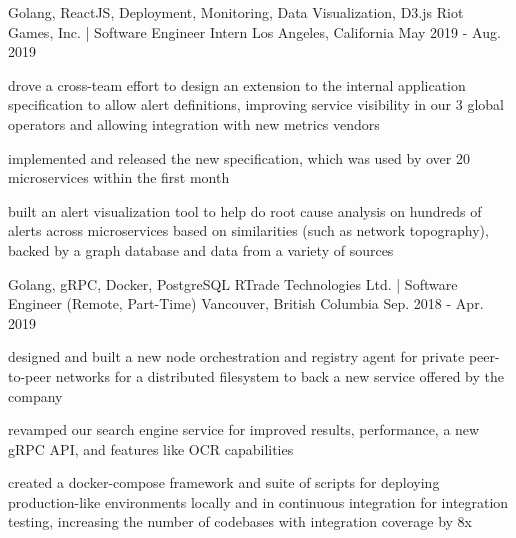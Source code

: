 

\begin{cventries}

  \cventry
    {Golang, ReactJS, Deployment, Monitoring, Data Visualization, D3.js} %
    {Riot Games, Inc. | Software Engineer Intern} %
    {Los Angeles, California} %
    {May 2019 - Aug. 2019} %
    {
      \begin{cvitems} %
        \item {drove a cross-team effort to design an extension to the internal application specification to allow alert definitions, improving service visibility in our 3 global operators and allowing integration with new metrics vendors}
        \item{implemented and released the new specification, which was used by over 20 microservices within the first month}
        \item {built an alert visualization tool to help do root cause analysis on hundreds of alerts across microservices based on similarities (such as network topography), backed by a graph database and data from a variety of sources}
      \end{cvitems}
    }

  \cventry
    {Golang, gRPC, Docker, PostgreSQL} %
    {RTrade Technologies Ltd. | Software Engineer (Remote, Part-Time)} %
    {Vancouver, British Columbia} %
    {Sep. 2018 - Apr. 2019} %
    {
      \begin{cvitems} %
        \item {designed and built a new node orchestration and registry agent for private  peer-to-peer networks for a distributed filesystem to back a new service offered by the company}
        \item {revamped our search engine service for improved results, performance, a new gRPC API, and features like OCR capabilities}
        \item {created a docker-compose framework and suite of scripts for deploying production-like environments locally and in continuous integration for integration testing, increasing the number of codebases with integration coverage by 8x}
      \end{cvitems}
    }


\end{cventries}

